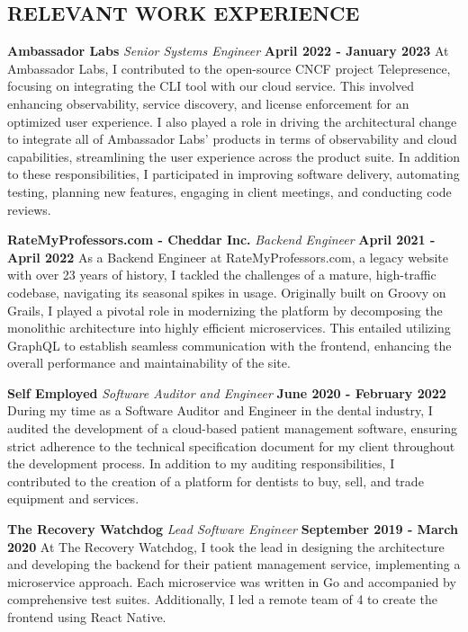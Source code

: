 \documentclass[margin]{./res}
\begin{document}
\begin{resume}
\section{RELEVANT WORK EXPERIENCE}
{\bf Ambassador Labs }\newline
{\it Senior Systems Engineer}\newline
{\bf April 2022 - January 2023}
At Ambassador Labs, I contributed to the open-source CNCF project Telepresence, focusing on integrating the CLI tool with our cloud service. This involved enhancing observability, service discovery, and license enforcement for an optimized user experience. I also played a role in driving the architectural change to integrate all of Ambassador Labs' products in terms of observability and cloud capabilities, streamlining the user experience across the product suite. In addition to these responsibilities, I participated in improving software delivery, automating testing, planning new features, engaging in client meetings, and conducting code reviews.

{\bf RateMyProfessors.com - Cheddar Inc. }\newline
{\it Backend Engineer }\newline
{\bf April 2021 - April 2022}\newline
As a Backend Engineer at RateMyProfessors.com, a legacy website with over 23 years of history, I tackled the challenges of a mature, high-traffic codebase, navigating its seasonal spikes in usage. Originally built on Groovy on Grails, I played a pivotal role in modernizing the platform by decomposing the monolithic architecture into highly efficient microservices. This entailed utilizing GraphQL to establish seamless communication with the frontend, enhancing the overall performance and maintainability of the site.

{\bf Self Employed}\newline
{\it Software Auditor and Engineer}\newline
{\bf June 2020 - February 2022}\newline
During my time as a Software Auditor and Engineer in the dental industry, I audited the development of a cloud-based patient management software, ensuring strict adherence to the technical specification document for my client throughout the development process.
In addition to my auditing responsibilities, I contributed to the creation of a platform for dentists to buy, sell, and trade equipment and services. 

{\bf The Recovery Watchdog}\newline
{\it Lead Software Engineer}\newline
{\bf September 2019 - March 2020}\newline
At The Recovery Watchdog, I took the lead in designing the architecture and developing the backend for their patient management service, implementing a microservice approach. Each microservice was written in Go and accompanied by comprehensive test suites. Additionally, I led a remote team of 4 to create the frontend using React Native.


\end{resume}
\end{document}
